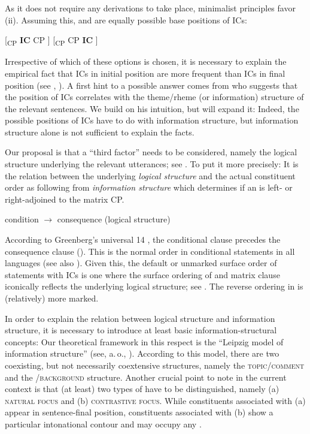 \documentclass[output=paper,colorlinks,citecolor=brown,newtxmath]{langsci/langscibook}
\begin{document}
\noindent As it does not require any derivations to take place, minimalist principles favor (ii). Assuming this,  and  are equally possible base positions of ICs:

\ea
\ea\label{tree:left}
{[\textsubscript{CP} \textbf{IC} CP ]}
\ex\label{tree:right}
{[\textsubscript{CP} CP \textbf{IC} ]}
\z
\z

\noindent Irrespective of which of these options is chosen, it is necessary to explain the empirical fact that ICs in initial position are more frequent than ICs in final position (see \citealt[74--75]{Svoboda1960a}, \citealt{Milotova2011,Milotova2012}). A first hint to a possible answer comes from \citet[75]{Svoboda1960a} who suggests that the position of ICs correlates with the theme/rheme (or information) structure of the relevant sentences. We build on his intuition, but will expand it: Indeed, the possible  positions of ICs have to do with information structure, but information structure alone is not sufficient to explain the facts.

Our proposal is that a ``third factor'' needs to be considered, namely the logical structure underlying the relevant utterances; see . To put it more precisely: It is the relation between the underlying \textit{logical structure} and the actual constituent order as following from \textit{information structure} which determines if an  is left- or right-adjoined to the matrix CP.

\ea\label{ex:logical}
condition $\rightarrow$ consequence \hfill (logical structure)
\z

\noindent According to Greenberg's universal 14 , the conditional clause precedes the consequence clause (\citealt[66]{Greenberg1963}). This is the normal order in conditional statements in all languages (see also \citealt[445--446]{Diessel2001}). Given this, the default or unmarked surface order of statements with ICs is one where the surface ordering of  and matrix clause iconically reflects the underlying logical structure; see . The reverse ordering in  is (relatively) more marked.

In order to explain the relation between logical structure and information structure, it is necessary to introduce at least basic information-structural concepts: Our theoretical framework in this respect is the ``Leipzig model of information structure'' (see, a.\,o., \citealt{JunghannsZybatow2009}). According to this model, there are two coexisting, but not necessarily coextensive structures, namely the \textsc{topic/comment} and the \textsc{/background} structure. Another crucial point to note in the current context is that (at least) two types of  have to be distinguished, namely (a) \textsc{natural focus} and (b) \textsc{contrastive focus}. While constituents associated with (a) appear in sentence-final position, constituents associated with (b) show a particular intonational contour and may occupy any .
\end{document}

